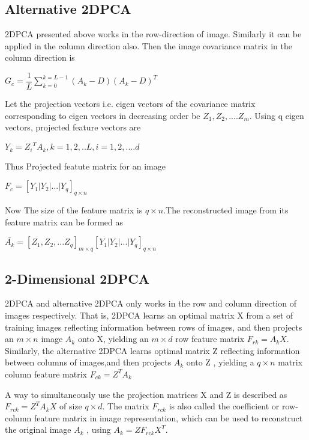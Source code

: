 \documentclass[a4paper, 12pt, notitlepage]{report}
\begin{document}
\subsection{Alternative 2DPCA}
%
2DPCA presented above works in the row-direction of image. Similarly it can be applied in the column direction also. Then the image covariance matrix in the column direction is
\begin{center}
$ G_c = \dfrac{1}{L} \displaystyle\sum_{k=0}^{k=L-1} {(A_k-D)}{(A_k-D)}^{T} $ 
\end{center}
Let the projection vectors i.e. eigen vectors of the covariance matrix corresponding to eigen vectors in decreasing order be $ Z_1,Z_2,....Z_m $. Using q eigen vectors, projected feature vectors are
\begin{center}
$ Y_k = {Z_i}^T{A_k},  k = 1,2,..L, i = 1,2,....d $
\end{center}
Thus Projected featute matrix for an image
\begin{center}
$ F_c = {[Y_1 | Y_2 |... | Y_q]}_{q \times n} $
\end{center}
Now The size of the feature matrix is $q \times n$.The reconstructed image from its feature matrix can be formed as
\begin{center}
$ \bar{A_k} = {[Z_1, Z_2, ...Z_q]}_{m \times q}{{[Y_1 | Y_2 |...| Y_q]}}_{q \times n} $
\end{center}

\subsection{2-Dimensional 2DPCA}
%
2DPCA and alternative 2DPCA only works in the row and column direction of images respectively. That is, 2DPCA learns an optimal matrix X from a set of 
training images reflecting information between rows of images, and then projects an $m \times n$ image $A_k$ onto X, yielding an $m \times d$ row feature matrix $F_{rk} = A_k X$. Similarly, the alternative 2DPCA learns optimal matrix Z reflecting information between columns of images,and then projects $A_k$ onto Z , yielding a $q \times n$ matrix column feature matrix $F_{ck} = Z^T A_k $
%
\begin{flushleft}
A way to simultaneously use the projection matrices X and Z is described as   $ F_{rck} = Z^T A_k X $ of size $ q \times d $. The matrix $F_{rck}$ is also called the coefficient or row-column feature matrix in image representation, which can be used to reconstruct the original image $A_k$ , using $A_k = Z F _{rck} X^T $.
\end{flushleft}
\end{document}
